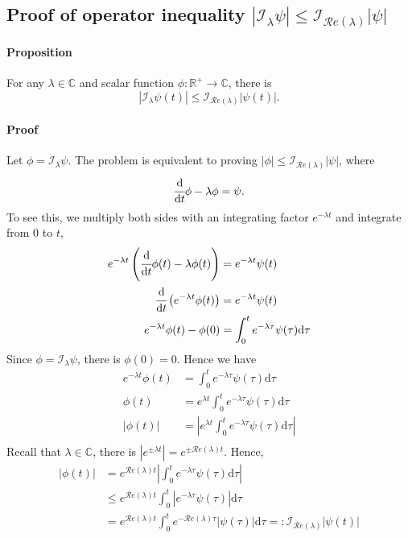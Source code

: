 \documentclass[accepted]{uai2023}
\newcommand{\dt}[1]{\cfrac{\mathrm{d} #1}{\mathrm{d} t}}
\newcommand{\I}{\mathcal{I}}
\renewcommand{\Re}[1]{\mathcal{R}e\left(#1\right)}
\begin{document}
\subsection{Proof of operator inequality $|\I_\lambda \psi| \leq \I_{\Re{\lambda}}|\psi|$}
    \paragraph{Proposition} For any $\lambda \in \mathbb{C}$ and scalar function $\phi: \mathbb{R}^{+} \to \mathbb{C}$, there is 
    \begin{equation}\label{eq:operator-I-inequality}
        |\I_\lambda \psi(t)| \leq \I_{\Re{\lambda}}|\psi(t)|.
    \end{equation}
    \paragraph{Proof} 
    Let $\phi = \I_\lambda \psi$. The problem is equivalent to proving $|\phi| \leq \I_{\Re{\lambda}}|\psi|$, where
    \begin{equation}
        \dt{}\phi-\lambda\phi = \psi.
    \end{equation}
    To see this, we multiply both sides with an integrating factor $e^{-\lambda t}$ and integrate from $0$ to $t$,
    \begin{align}
        e^{-\lambda t} \left(\dt{}\phi(t)-\lambda\phi(t)\right) &= e^{-\lambda t}\psi(t) \\
        \dt{}\left(e^{-\lambda t}\phi(t)\right) &= e^{-\lambda t}\psi(t) \\
        e^{-\lambda t}\phi(t) - \phi(0) &= \int_{0}^{t} e^{-\lambda \tau}\psi(\tau) \mathrm{d}\tau
    \end{align}
    Since $\phi = \I_{\lambda} \psi$, there is $\phi(0) = 0$. Hence we have
    \begin{align}
        e^{-\lambda t}\phi(t) &= \int_{0}^{t} e^{-\lambda \tau}\psi(\tau) \mathrm{d}\tau \\
        \phi(t) &= e^{\lambda t}\int_{0}^{t} e^{-\lambda \tau}\psi(\tau) \mathrm{d}\tau \\
        |\phi(t)| &= \left|e^{\lambda t}\int_{0}^{t} e^{-\lambda \tau}\psi(\tau) \mathrm{d}\tau\right| \\
    \end{align}
    Recall that $\lambda \in \mathbb{C}$, there is $\left|e^{\pm \lambda t}\right| = e^{\pm \Re{\lambda} t}$. 
    Hence,
    \begin{align}
        |\phi(t)| &= e^{\Re{\lambda} t} \left|\int_{0}^{t} e^{-\lambda \tau}\psi(\tau) \mathrm{d}\tau \right| \\
        &\leq e^{\Re{\lambda} t} \int_{0}^{t} \left|e^{-\lambda \tau}\psi(\tau) \right|\mathrm{d}\tau  \\
        &=e^{\Re{\lambda} t} \int_{0}^{t} e^{-\Re{\lambda} \tau}|\psi(\tau)|\mathrm{d}\tau =: \I_{\Re{\lambda}}|\psi(t)|
    \end{align}
\end{document}
